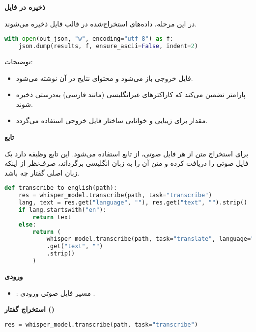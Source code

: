 \documentclass{article}
\begin{document}
\textbf{ذخیره در فایل }

در این مرحله، داده‌های استخراج‌شده در قالب فایل  ذخیره می‌شوند.

\begin{latin}
\begin{lstlisting}[language=Python]
with open(out_json, "w", encoding="utf-8") as f:
    json.dump(results, f, ensure_ascii=False, indent=2)
\end{lstlisting}
\end{latin}

توضیحات:
\begin{itemize}
    \item فایل خروجی  باز می‌شود و محتوای نتایج در آن نوشته می‌شود.
    \item پارامتر  تضمین می‌کند که کاراکترهای غیرانگلیسی (مانند فارسی) به‌درستی ذخیره شوند.
    \item مقدار  برای زیبایی و خوانایی ساختار فایل خروجی استفاده می‌گردد.
\end{itemize}

\textbf{تابع }

برای استخراج متن از هر فایل صوتی، از تابع  استفاده می‌شود. این تابع وظیفه دارد یک فایل صوتی را دریافت کرده و متن آن را به زبان انگلیسی برگرداند، صرف‌نظر از اینکه زبان اصلی گفتار چه باشد.

\begin{latin}
\begin{lstlisting}[language=Python]
def transcribe_to_english(path):
    res = whisper_model.transcribe(path, task="transcribe")
    lang, text = res.get("language", ""), res.get("text", "").strip()
    if lang.startswith("en"):
        return text
    else:
        return (
            whisper_model.transcribe(path, task="translate", language="en")
            .get("text", "")
            .strip()
        )
\end{lstlisting}
\end{latin}

\textbf{ورودی}

\begin{itemize}
    \item {}: مسیر فایل صوتی ورودی .
\end{itemize}

\textbf{استخراج گفتار ()}

\begin{latin}
\begin{lstlisting}[language=Python]
res = whisper_model.transcribe(path, task="transcribe")
\end{lstlisting}
\end{latin}
\end{document}
